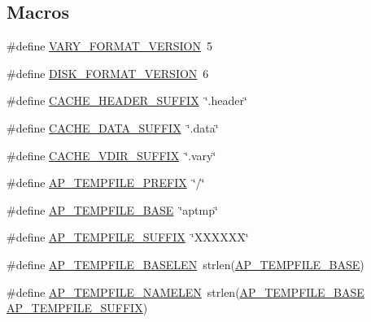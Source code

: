 \subsection*{Macros}
\begin{DoxyCompactItemize}
\item 
\#define \hyperlink{group__Cache__cache_ga13b74669aa4a3712a50d96053d8a388b}{V\+A\+R\+Y\+\_\+\+F\+O\+R\+M\+A\+T\+\_\+\+V\+E\+R\+S\+I\+ON}~5
\item 
\#define \hyperlink{group__Cache__cache_gab81f3d48d94033866767715d9dedad85}{D\+I\+S\+K\+\_\+\+F\+O\+R\+M\+A\+T\+\_\+\+V\+E\+R\+S\+I\+ON}~6
\item 
\#define \hyperlink{group__Cache__cache_ga257ac42103997e56f459c0a70c6055b6}{C\+A\+C\+H\+E\+\_\+\+H\+E\+A\+D\+E\+R\+\_\+\+S\+U\+F\+F\+IX}~\char`\"{}.header\char`\"{}
\item 
\#define \hyperlink{group__Cache__cache_ga32e584290be62749406dd44772c54fbb}{C\+A\+C\+H\+E\+\_\+\+D\+A\+T\+A\+\_\+\+S\+U\+F\+F\+IX}~\char`\"{}.data\char`\"{}
\item 
\#define \hyperlink{group__Cache__cache_gadcd1300561508fc86b68fda6b775b5bd}{C\+A\+C\+H\+E\+\_\+\+V\+D\+I\+R\+\_\+\+S\+U\+F\+F\+IX}~\char`\"{}.vary\char`\"{}
\item 
\#define \hyperlink{group__Cache__cache_ga609fdfa445244cd79c5e16f729dc6e4c}{A\+P\+\_\+\+T\+E\+M\+P\+F\+I\+L\+E\+\_\+\+P\+R\+E\+F\+IX}~\char`\"{}/\char`\"{}
\item 
\#define \hyperlink{group__Cache__cache_ga12620840f8efdfebfc661efeceb9f279}{A\+P\+\_\+\+T\+E\+M\+P\+F\+I\+L\+E\+\_\+\+B\+A\+SE}~\char`\"{}aptmp\char`\"{}
\item 
\#define \hyperlink{group__Cache__cache_gaedd8e0eae5a66168309188af5c51dee2}{A\+P\+\_\+\+T\+E\+M\+P\+F\+I\+L\+E\+\_\+\+S\+U\+F\+F\+IX}~\char`\"{}X\+X\+X\+X\+XX\char`\"{}
\item 
\#define \hyperlink{group__Cache__cache_gafacbda68706425c6d67be00aeb66a42a}{A\+P\+\_\+\+T\+E\+M\+P\+F\+I\+L\+E\+\_\+\+B\+A\+S\+E\+L\+EN}~strlen(\hyperlink{group__Cache__cache_ga12620840f8efdfebfc661efeceb9f279}{A\+P\+\_\+\+T\+E\+M\+P\+F\+I\+L\+E\+\_\+\+B\+A\+SE})
\item 
\#define \hyperlink{group__Cache__cache_ga1f808bd904895d1dbdf387a4e480fcd1}{A\+P\+\_\+\+T\+E\+M\+P\+F\+I\+L\+E\+\_\+\+N\+A\+M\+E\+L\+EN}~strlen(\hyperlink{group__Cache__cache_ga12620840f8efdfebfc661efeceb9f279}{A\+P\+\_\+\+T\+E\+M\+P\+F\+I\+L\+E\+\_\+\+B\+A\+SE} \hyperlink{group__Cache__cache_gaedd8e0eae5a66168309188af5c51dee2}{A\+P\+\_\+\+T\+E\+M\+P\+F\+I\+L\+E\+\_\+\+S\+U\+F\+F\+IX})

\end{DoxyCompactItemize}
